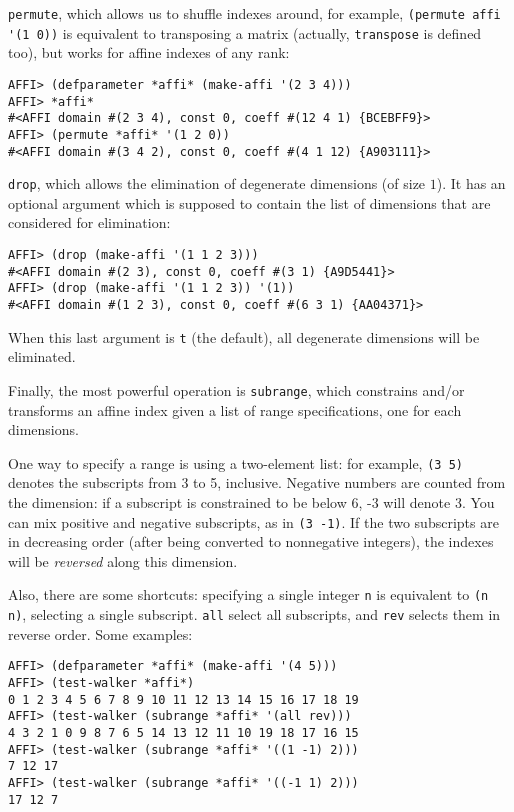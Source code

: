 \documentclass[letterpaper,11pt]{article}
\begin{document}
\lstinline!permute!, which allows us to shuffle indexes around, for
example, \lstinline!(permute affi '(1 0))! is equivalent to
transposing a matrix (actually, \lstinline!transpose! is defined too),
but works for affine indexes of any rank:
\begin{lstlisting}
AFFI> (defparameter *affi* (make-affi '(2 3 4)))
AFFI> *affi*
#<AFFI domain #(2 3 4), const 0, coeff #(12 4 1) {BCEBFF9}>
AFFI> (permute *affi* '(1 2 0))
#<AFFI domain #(3 4 2), const 0, coeff #(4 1 12) {A903111}>
\end{lstlisting}

\lstinline!drop!, which allows the elimination of degenerate
dimensions (of size $1$).  It has an optional argument which is
supposed to contain the list of dimensions that are considered for
elimination:
\begin{lstlisting}
AFFI> (drop (make-affi '(1 1 2 3)))
#<AFFI domain #(2 3), const 0, coeff #(3 1) {A9D5441}>
AFFI> (drop (make-affi '(1 1 2 3)) '(1))
#<AFFI domain #(1 2 3), const 0, coeff #(6 3 1) {AA04371}>
\end{lstlisting}
When this last argument is \lstinline!t! (the default), all degenerate
dimensions will be eliminated.

Finally, the most powerful operation is \lstinline!subrange!, which
constrains and/or transforms an affine index given a list of range
specifications, one for each dimensions.

One way to specify a range is using a two-element list: for example,
\lstinline!(3 5)! denotes the subscripts from 3 to 5, inclusive.
Negative numbers are counted from the dimension: if a subscript is
constrained to be below 6, -3 will denote 3.  You can mix positive and
negative subscripts, as in \lstinline!(3 -1)!.  If the two subscripts
are in decreasing order (after being converted to nonnegative
integers), the indexes will be \emph{reversed} along this dimension.

Also, there are some shortcuts: specifying a single integer
\lstinline!n! is equivalent to \lstinline!(n n)!, selecting a single
subscript.  \lstinline!all! select all subscripts, and \lstinline!rev!
selects them in reverse order.  Some examples:
\begin{lstlisting}
AFFI> (defparameter *affi* (make-affi '(4 5)))
AFFI> (test-walker *affi*)
0 1 2 3 4 5 6 7 8 9 10 11 12 13 14 15 16 17 18 19 
AFFI> (test-walker (subrange *affi* '(all rev)))
4 3 2 1 0 9 8 7 6 5 14 13 12 11 10 19 18 17 16 15 
AFFI> (test-walker (subrange *affi* '((1 -1) 2)))
7 12 17 
AFFI> (test-walker (subrange *affi* '((-1 1) 2)))
17 12 7 
\end{lstlisting}
\end{document}
